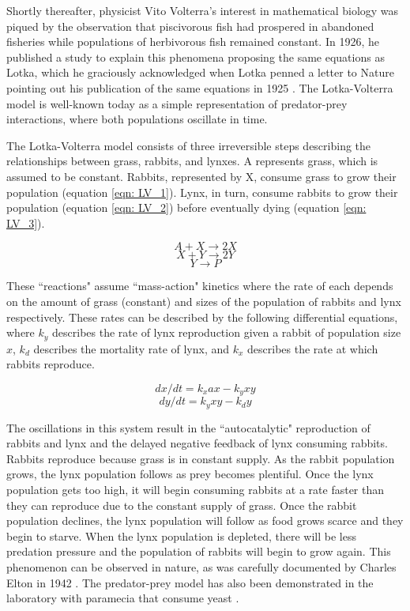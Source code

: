 \documentclass[12pt]{report}
\begin{document}
Shortly thereafter, physicist Vito Volterra's interest in mathematical biology was piqued by the observation that piscivorous fish had prospered in abandoned fisheries while populations of herbivorous fish remained constant. In 1926, he published a study to explain this phenomena proposing the same equations as Lotka, which he graciously acknowledged when Lotka penned a letter to Nature pointing out his publication of the same equations in 1925 \cite{Volterra, lotka-volterra}. The Lotka-Volterra model is well-known today as a simple representation of predator-prey interactions, where both populations oscillate in time. 

The Lotka-Volterra model consists of three irreversible steps describing the relationships between grass, rabbits, and lynxes. A represents grass, which is assumed to be constant. Rabbits, represented by X, consume grass to grow their population (equation \ref{eqn: LV_1}). Lynx, in turn, consume rabbits to grow their population (equation \ref{eqn: LV_2}) before eventually dying (equation \ref{eqn: LV_3}).

\begin{equation}
\label{eqn: LV_1}
A + X \to 2X
\end{equation}
\begin{equation}
\label{eqn: LV_2}
X + Y \to 2Y
\end{equation}
\begin{equation}
\label{eqn: LV_3}
Y \to P
\end{equation}

These ``reactions" assume ``mass-action" kinetics where the rate of each depends on the amount of grass (constant) and sizes of the population of rabbits and lynx respectively. These rates can be described by the following differential equations, where ${k_{y}}$ describes the rate of lynx reproduction given a rabbit of population size ${x}$, ${k_{d}}$ describes the mortality rate of lynx, and ${k_{x}}$ describes the rate at which rabbits reproduce. 

\begin{equation}
dx/dt = k_{x}ax - k_{y}xy
\end{equation}
\begin{equation}
dy/dt = k_{y}xy - k_{d}y
\end{equation}

The oscillations in this system result in the ``autocatalytic" reproduction of rabbits and lynx and the delayed negative feedback of lynx consuming rabbits. Rabbits reproduce because grass is in constant supply. As the rabbit population grows, the lynx population follows as prey becomes plentiful. Once the lynx population gets too high, it will begin consuming rabbits at a rate faster than they can reproduce due to the constant supply of grass. Once the rabbit population declines, the lynx population will follow as food grows scarce and they begin to starve. When the lynx population is depleted, there will be less predation pressure and the population of rabbits will begin to grow again. This phenomenon can be observed in nature, as was carefully documented by Charles Elton in 1942 \cite{Elton1942}. The predator-prey model has also been demonstrated in the laboratory with paramecia that consume yeast \cite{Gause}.
\end{document}
